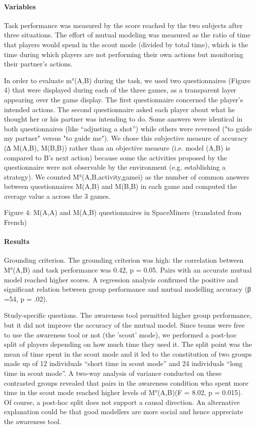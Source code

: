 \documentclass[twocolumn]{article}
\begin{document}
\paragraph{Variables}

Task performance was measured by the score reached by the two subjects after
three situations. The effort of mutual modeling was measured as the ratio of
time that players would spend in the scout mode (divided by total time), which
is the time during which players are not performing their own actions but
monitoring their partner's actions.

In order to evaluate m°(A,B) during the task, we used two questionnaires (Figure
4) that were displayed during each of the three games, as a transparent layer
appearing over the game display. The first questionnaire concerned the player’s
intended actions. The second questionnaire asked each player about what he
thought her or his partner was intending to do. Some answers were identical in
both questionnaires (like “adjusting a shot”) while others were reversed ("to
guide my partner" versus "to guide me"). We chose this subjective measure of
accuracy (∆ M(A,B), M(B,B)) rather than an objective measure (i.e. model (A,B)
is compared to B's next action) because some the activities proposed by the
questionnaire were not observable by the environment (e.g. establishing a
strategy). We counted M°(A,B,activity,gamei) as the number of common answers
between questionnaires M(A,B) and M(B,B) in each game and computed the average
value a across the 3 games.


Figure 4: M(A,A) and M(A,B) questionnaires in SpaceMiners (translated from French)

\paragraph{Results}

Grounding criterion. The grounding criterion was high: the correlation between
M°(A,B) and task performance was 0.42, p = 0.05. Pairs with an accurate mutual
model reached higher scores. A regression analysis confirmed the positive and
significant relation between group performance and mutual modelling accuracy (β
=54, p = .02).

Study-specific questions. The awareness tool permitted higher group performance,
but it did not improve the accuracy of the mutual model. Since teams were free
to use the awareness tool or not (the 'scout' mode), we performed a post-hoc
split of players depending on how much time they used it. The split point was
the mean of time spent in the scout mode and it led to the constitution of two
groups made up of 12 individuals “short time in scout mode” and 24 individuals
“long time in scout mode”. A two-way analysis of variance conducted on these
contrasted groups revealed that pairs in the awareness condition who spent more
time in the scout mode reached higher levels of M°(A,B)(F = 8.02, p = 0.015). Of
course, a post-hoc split does not support a causal direction. An alternative
explanation could be that good modellers are more social and hence appreciate
the awareness tool.
\end{document}
